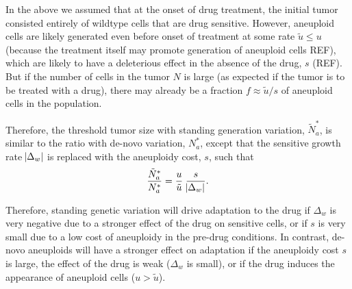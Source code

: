\documentclass[12pt]{extarticle}
\newcommand{\e}{{\rm e}}
\begin{document}
In the above we assumed that at the onset of drug treatment, the initial tumor consisted entirely of wildtype cells that are drug sensitive.
However, aneuploid cells are likely generated even before onset of treatment at some rate $\tilde{u} \le u$ (because the treatment itself may promote generation of aneuploid cells REF), which are likely to have a deleterious effect in the absence of the drug, $s$ (REF). %
But if the number of cells in the tumor $N$ is large (as expected if the tumor is to be treated with a drug), there may already be a fraction $f \approx \tilde{u}/s$ of aneuploid cells in the population.

Therefore, the threshold tumor size with standing generation variation, $\tilde{N}^*_{a}$, is similar to the ratio with de-novo variation, $N^*_a$, except that the sensitive growth rate $\abs{\Delta_w}$ is replaced with the aneuploidy cost, $s$, such that 
\begin{equation}
\frac{\tilde{N}^*_{a}}{N^*_{a}} = \frac{u}{\tilde{u}} \; \frac{s}{\abs{\Delta_w}} .
\end{equation}

Therefore, standing genetic variation will drive adaptation to the drug if $\Delta_w$ is very negative due to a stronger effect of the drug on sensitive cells, or if $s$ is very small due to a low cost of aneuploidy in the pre-drug conditions.
In contrast, de-novo aneuploids will have a stronger effect on adaptation if the aneuploidy cost $s$ is large, the effect of the drug is weak ($\Delta_w$ is small), or if the drug induces the appearance of aneuploid cells ($u > \tilde u$). 


%
\end{document}
